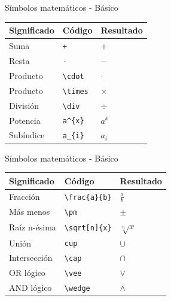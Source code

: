 \documentclass[
  ignorenonframetext,
  aspectratio=169]{beamer}
\begin{document}
\begin{frame}[fragile]{Símbolos matemáticos - Básico}
\protect\hypertarget{suxedmbolos-matemuxe1ticos---buxe1sico}{}
\begin{longtable}[]{@{}lll@{}}
\toprule()
Significado & Código & Resultado \\
\midrule()
\endhead
Suma & \texttt{+} & \(+\) \\
Resta & \texttt{-} & \(-\) \\
Producto & \texttt{\textbackslash{}cdot} & \(\cdot\) \\
Producto & \texttt{\textbackslash{}times} & \(\times\) \\
División & \texttt{\textbackslash{}div} & \(\div\) \\
Potencia & \texttt{a\^{}\{x\}} & \(a^{x}\) \\
Subíndice & \texttt{a\_\{i\}} & \(a_{i}\) \\
\bottomrule()
\end{longtable}
\end{frame}

\begin{frame}[fragile]{Símbolos matemáticos - Básico}
\protect\hypertarget{suxedmbolos-matemuxe1ticos---buxe1sico-1}{}
\begin{longtable}[]{@{}lll@{}}
\toprule()
Significado & Código & Resultado \\
\midrule()
\endhead
Fracción & \texttt{\textbackslash{}frac\{a\}\{b\}} & \(\frac{a}{b}\) \\
Más menos & \texttt{\textbackslash{}pm} & \(\pm\) \\
Raíz n-ésima & \texttt{\textbackslash{}sqrt{[}n{]}\{x\}} &
\(\sqrt[n]{x}\) \\
Unión & \texttt{cup} & \(\cup\) \\
Intersección & \texttt{\textbackslash{}cap} & \(\cap\) \\
OR lógico & \texttt{\textbackslash{}vee} & \(\vee\) \\
AND lógico & \texttt{\textbackslash{}wedge} & \(\wedge\) \\
\bottomrule()
\end{longtable}
\end{frame}
\end{document}
